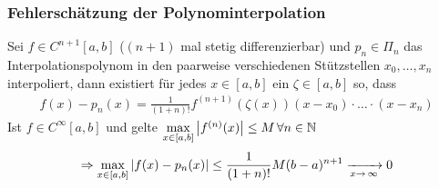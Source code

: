 \subsubsection{Fehlerschätzung der Polynominterpolation}
Sei $f \in C^{n+1} [a, b]$ ($(n+1)$ mal stetig differenzierbar) und $p_n \in \Pi_n$
das Interpolationspolynom in den paarweise verschiedenen Stützstellen $x_0, \dots, x_n$
interpoliert, dann existiert für jedes $x \in [a, b]$ ein $\zeta \in [a, b]$ so, dass
\begin{align*}
  f(x) - p_n(x) = \frac{1}{(1 + n)!} f^{(n+1)}(\zeta(x))(x - x_0)\cdot \dots \cdot(x - x_n)
\end{align*}
Ist $f \in C^\infty [a, b]$ und gelte $\underset{x \in [a, b]}{\max} \left| f^{(n)}(x) \right| \leq M \, \forall n \in \mathbb{N}$ \\
\begin{align*}
  \Rightarrow \underset{x \in [a, b]}{\max} \left| f(x) - p_n(x) \right| \leq 
  \frac{1}{(1 + n)!}M(b - a)^{n + 1} \xrightarrow[x\to\,\infty]{} 0
\end{align*}

